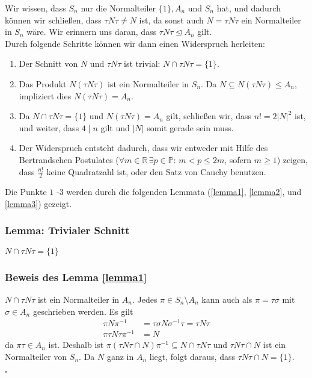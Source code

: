 \documentclass[12pt, german]{article}
\newcommand{\R}{\mathbb{R}}
\newcommand{\bewiesen}{
	
	\begin{flushright}
		$\square$  \\
\end{flushright}}
\begin{document}
	Wir wissen, dass $S_n$ nur die Normalteiler $\{1\}, A_n$ und $S_n$ hat, und dadurch können wir schlie\ss en, dass $\tau N\tau \not = N$ ist, da sonst auch $N = \tau N \tau $ ein Normalteiler in $S_n$ wäre. Wir erinnern uns daran, dass $\tau N \tau \trianglelefteq A_n$ gilt. \\
	Durch folgende Schritte können wir dann einen Widerspruch herleiten: 
	
	\begin{enumerate}[label=\arabic*.]
		\item Der Schnitt von $N$ und $\tau N \tau$ ist trivial: $N \cap \tau N \tau = \{1\}$.
		\item Das Produkt $N(\tau N \tau)$ ist ein Normalteiler in $S_n$. Da $N \subseteq N(\tau N \tau) \leq A_n$, impliziert dies $N(\tau N \tau) = A_n$.
		\item Da $N\cap \tau N \tau =  \{1\}$ und $N(  \tau N \tau ) = A_n$ gilt, schlie\ss en wir, dass $n! = 2 |N|^2$ ist, und weiter, dass $4 \mid n$ gilt und $|N|$ somit gerade sein muss. 
		\item Der Widerspruch entsteht dadurch, dass wir entweder mit Hilfe des Bertrandschen Postulates ($\forall m \in \R\, \exists p \in \mathbb{P}: \, m < p \leq 2m$, sofern $m \geq 1$) zeigen, dass $\frac{n!}{2}$ keine Quadratzahl ist, oder den Satz von Cauchy benutzen. 
	\end{enumerate}
	Die Punkte $1$ -$3$ werden durch die folgenden Lemmata (\ref{lemma1}, \ref{lemma2}, und \ref{lemma3}) gezeigt. 
	
	\subsubsection{Lemma: Trivialer Schnitt \label{lemma1}}
	$N \cap \tau N \tau = \{1\}$
	\subsubsection{Beweis des Lemma \ref{lemma1}}
	$N \cap \tau N \tau$ ist ein Normalteiler in $A_n$. Jedes $\pi \in S_n \setminus A_n$ kann auch als $\pi = \tau\sigma$ mit $\sigma \in A_n$ geschrieben werden.
	Es gilt
	\begin{align*}
		\pi N \pi^{-1} &= \tau \sigma N \sigma^{-1} \tau = \tau N \tau  \\ 
		\pi \tau N \tau \pi^{-1} &= N
	\end{align*} 
	da $\pi\tau \in A_n$ ist. 
	Deshalb ist $\pi(\tau N \tau \cap N) \pi^{-1} \subseteq N \cap \tau N \tau$ und $\tau N \tau \cap N$ ist ein Normalteiler von $S_n$. Da $N$ ganz in $A_n$ liegt, folgt daraus, dass $\tau N \tau \cap N = \{1\}$. 
	\bewiesen
	
\end{document}
